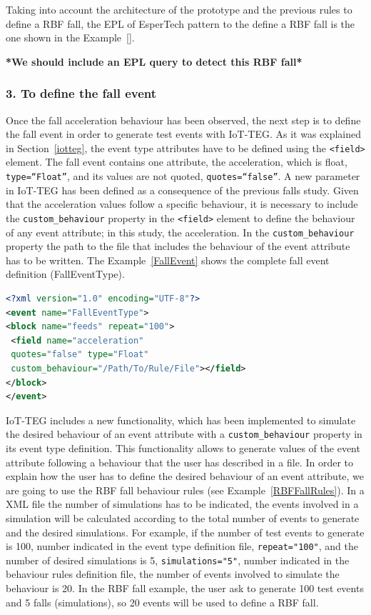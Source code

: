 \documentclass[conference]{IEEEtran}
\theoremstyle{definition}
\begin{document}
Taking into account the architecture of the prototype and the previous rules to define a RBF fall, the EPL of EsperTech
pattern to the define a RBF fall is the one shown in the Example~\ref{}.

\textbf{*We should include an EPL query to detect this RBF fall*}

\subsubsection*{3. To define the fall event} Once the fall acceleration behaviour has been observed, the next step is to define the 
fall event in order to generate test events with IoT-TEG. As it was explained in Section~\ref{iotteg}, the event type attributes have
to be defined using the \texttt{<field>} element. The fall event contains one attribute, the acceleration, which is float, 
\texttt{type=``Float''}, and its values are not quoted, \texttt{quotes=``false''}. A new parameter in IoT-TEG has been defined as a 
consequence of the previous falls study. Given that the acceleration values follow a specific behaviour, it is necessary to include 
the \texttt{custom\_behaviour} property in the \texttt{<field>} element to define the behaviour of any event attribute; 
in this study, the acceleration. In the \texttt{custom\_behaviour} property the path to the file that includes the behaviour of the 
event attribute has to be written. The Example~\ref{FallEvent} shows the complete fall event definition (FallEventType).

\begin{lstlisting}[basicstyle=\ttfamily\footnotesize,language=XML,caption={Fall event type definition},label=FallEvent]
<?xml version="1.0" encoding="UTF-8"?>
<event name="FallEventType">
<block name="feeds" repeat="100">
 <field name="acceleration" 
 quotes="false" type="Float" 
 custom_behaviour="/Path/To/Rule/File"></field>
</block>
</event>
\end{lstlisting}

IoT-TEG includes a new functionality, which has been implemented to simulate the desired behaviour of an 
event attribute with a \texttt{custom\_behaviour} property in its event type definition. This functionality 
allows to generate values of the event attribute following a behaviour that the user has described in a file.
In order to explain how the user has to define the desired behaviour of an event attribute, we are going
to use the RBF fall behaviour rules (see Example~\ref{RBFFallRules}). In a XML file the number of simulations has to be
indicated, the events involved in a simulation will be calculated according to the total number of events
to generate and the desired simulations. For example, if the number of test events to generate is 100, 
number indicated in the event type definition file, \texttt{repeat="100"}, and the number of desired 
simulations is 5, \texttt{simulations="5"}, number indicated in the behaviour rules definition file, 
the number of events involved to simulate the behaviour is 20. In the RBF fall example, the user ask to 
generate 100 test events and 5 falls (simulations), so 20 events will be used to define a RBF fall.
\end{document}
